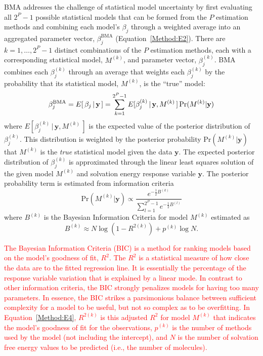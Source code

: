 \documentclass[journal=jpcbfk, manuscript=article]{achemso}
\newcommand{\LG}[1]{\textcolor{black}{#1}}
\newcommand{\+}[1]{\ensuremath{\mathbf{#1}}}
\renewcommand{\vec}[1]{{\mathbf{#1}}}
\newcommand{\rev}[1]{\textsf{\textcolor{red}{#1}}}
\begin{document}
BMA addresses the challenge of statistical model uncertainty by first evaluating all $2^{P}-1$ possible statistical models that can be formed from the $P$ estimation methods and combining each model's $\beta_j$ through a weighted average into an aggregated parameter vector, $\beta_j^{\text{BMA}}$ (Equation~\ref{Method:E2}).
There are $k = 1, \ldots, 2^P-1$ distinct combinations of the $P$ estimation methods, each with a corresponding statistical model, $M^{(k)}$, and parameter vector, $\beta^{(k)}_j$. 
BMA combines each $\beta_{j}^{(k)}$ through an average that weights each $\beta^{(k)}_j$ by the probability that its statistical model, $M^{(k)}$, is the ``true'' model:
\begin{equation} \label{Method:E2}
	\LG{\beta_j^{\text{BMA}} = E[\,\beta_j \,|\, \+y\,]  = \sum_{k=1}^{2^P-1} E[\beta_{j}^{(k)}\,|\, \+y,M^{(k)}\,] \, {\mathrm{Pr}}(M^{(k)} | \+y)}
\end{equation}
where $E[\beta_{j}^{(k)}\,|\, \+y,M^{(k)}\,]$ is the expected value of the posterior distribution of $\beta^{(k)}_j$.
This distribution is weighted by the posterior probability ${\mathrm{Pr}}(M^{(k)} | \+y)$ that $M^{(k)}$ is the \emph{true} statistical model given the data $\textbf{y}$.
The expected posterior distribution of $\beta^{(k)}_j$ is approximated through the linear least squares solution of the given model $M^{(k)}$ and solvation energy response variable $\vec{y}$.
The posterior probability term is estimated from information criteria \cite{Raftery:1995}
\begin{equation} \label{Method:E3} 
	{\mathrm{Pr}}(M^{(k)} | \+y) \propto \frac{e^{-\frac{1}{2}B^{(k)}}}{\sum^{2^P-1}_{l=1} e^{-\frac{1}{2}B^{(l)}}} 
\end{equation}
where $B^{(k)}$ is the Bayesian Information Criteria for model $M^{(k)}$ estimated as
\begin{equation} \label{Method:E4} 
	B^{(k)} \approx N \log{(1-R^{2(k)})} + p^{(k)} \log{N}.
\end{equation}

\rev{The Bayesian Information Criteria (BIC) is a method for ranking models based on the model's goodness of fit, $R^2$.
The $R^2$ is a statistical measure of how close the data are to the fitted regression line.
It is essentially the percentage of the response variable variation that is explained by a linear mode.
In contrast to other information criteria, the BIC strongly penalizes models for having too many parameters. 
In essence, the BIC strikes a parsimonious balance between sufficient complexity for a model to be useful, but not so complex as to be overfitting. 
In Equation~\ref{Method:E4},  $R^{2(k)}$ is this adjusted $R^2$ for model $M^{(k)}$ that indicates the model's goodness of fit for the observations, $p^{(k)}$ is the number of methods used by the model (not including the intercept), and $N$ is the number of solvation free energy values to be predicted (i.e., the number of molecules).}
\end{document}

